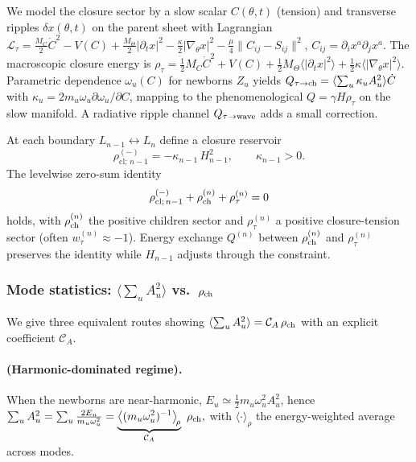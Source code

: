 \documentclass[11pt]{article}
\begin{document}
We model the closure sector by a slow scalar $C(\theta,t)$ (tension) and transverse ripples $\delta x(\theta,t)$ on the parent sheet with Lagrangian
$\mathcal L_\tau = \frac{M_C}{2}\dot C^2 - V(C) + \frac{M_\Theta}{2}|\partial_t x|^2 - \frac{\kappa}{2}|\nabla_\theta x|^2 - \frac{\mu}{4}\|C_{ij}-S_{ij}\|^2$,
$C_{ij}=\partial_i x^a\partial_j x^a$.
The macroscopic closure energy is $\rho_\tau=\frac12 M_C \dot C^2 + V(C) + \frac12 M_\Theta\langle |\partial_t x|^2\rangle + \frac12 \kappa\langle |\nabla_\theta x|^2\rangle$.
Parametric dependence $\omega_u(C)$ for newborns $Z_u$ yields $Q_{\tau\to{\rm ch}}=\langle\sum_u \kappa_u A_u^2\rangle \dot C$ with $\kappa_u=2m_u\omega_u\partial\omega_u/\partial C$,
mapping to the phenomenological $Q=\gamma H \rho_\tau$ on the slow manifold. A radiative ripple channel $Q_{\tau\to{\rm wave}}$ adds a small correction.


At each boundary $L_{n-1}\leftrightarrow L_n$ define a closure reservoir
\begin{equation}
\rho^{(-)}_{\mathrm{cl};\,n-1}=-\kappa_{n-1}\,H_{n-1}^2,\qquad \kappa_{n-1}>0.
\end{equation}
The levelwise zero-sum identity
\begin{equation}
\rho^{(-)}_{\mathrm{cl};\,n-1}+\rho^{(n)}_{\rm ch}+\rho^{(n)}_{\tau}=0
\end{equation}
holds, with $\rho^{(n)}_{\rm ch}$ the positive children sector and $\rho^{(n)}_{\tau}$ a positive closure-tension sector (often $w_\tau^{(n)}\approx -1$). 
Energy exchange $Q^{(n)}$ between $\rho^{(n)}_{\rm ch}$ and $\rho^{(n)}_{\tau}$ preserves the identity while $H_{n-1}$ adjusts through the constraint.



\subsubsection{Mode statistics: $\langle\sum_u A_u^2\rangle$ vs.\ $\rho_{\rm ch}$}\label{subsub:mode-stats}
We give three equivalent routes showing $\langle\sum_u A_u^2\rangle = \mathcal C_A\,\rho_{\rm ch}$ with an explicit coefficient $\mathcal C_A$.

\paragraph{(Harmonic-dominated regime).}
When the newborns are near-harmonic, $E_u\simeq \tfrac12 m_u\omega_u^2 A_u^2$, hence
\(
\sum_u A_u^2 = \sum_u \frac{2E_u}{m_u\omega_u^2} = \underbrace{\big\langle (m_u\omega_u^2)^{-1}\big\rangle_{\!\rho}}_{\mathcal C_A}\ \rho_{\rm ch},
\)
with $\langle\cdot\rangle_\rho$ the energy-weighted average across modes.
\end{document}
